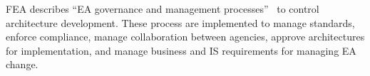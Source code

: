 FEA describes ``EA governance and management processes''~\cite[Sec. 2]{FEA_PMO2007} to control architecture development. These process are implemented to manage standards, enforce compliance, manage collaboration between agencies, approve architectures for implementation, and  manage business and IS requirements for managing EA change.

%
%












